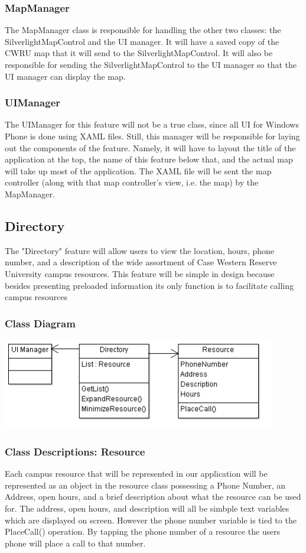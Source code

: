 \documentclass[pdftex,12pt,letter]{article}
\begin{document}
\subsubsection{MapManager}
The MapManager class is responsible for handling the other two classes: the SilverlightMapControl and the UI manager. It will have a saved copy of the CWRU map that it will send to the SilverlightMapControl. It will also be responsible for sending the SilverlightMapControl to the UI manager so that the UI manager can display the map.
\subsubsection{UIManager}
The UIManager for this feature will not be a true class, since all UI for Windows Phone is done using XAML files. Still, this manager will be responsible for laying out the components of the feature. Namely, it will have to layout the title of the application at the top, the name of this feature below that, and the actual map will take up most of the application. The XAML file will be sent the map controller (along with that map controller's view, i.e. the map)  by the MapManager.
\subsection{Directory}
The "Directory" feature will allow users to view the location, hours, phone number, and a description of the wide assortment of Case Western Reserve University campus resources. This feature will be simple in design because besides presenting preloaded information its only function is to facilitate calling campus resources 
\subsubsection{Class Diagram}
\begin{flushleft}
\includegraphics[width=120mm]{DirectoryCD.png}
\end{flushleft}
\subsubsection{Class Descriptions: Resource}
Each campus resource that will be represented in our application will be represented as an object in the resource class possessing a Phone Number, an Address, open hours, and a brief description about what the resource can be used for. The address, open hours, and description will all be simbple text variables which are displayed on screen. However the phone number variable is tied to the PlaceCall() operation. By tapping the phone number of a resource the users phone will place a call to that number.
\end{document}
